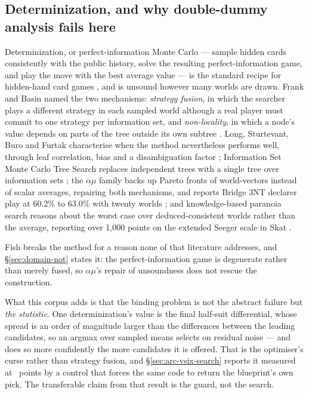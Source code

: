 \subsection{Determinization, and why double-dummy analysis fails here}
\label{sec:related-determinization}

Determinization, or perfect-information Monte Carlo --- sample hidden cards consistently with the
public history, solve the resulting perfect-information game, and play the move with the best
average value --- is the standard recipe for hidden-hand card games \cite{levy,ginsberg-gib}, and is
unsound however many worlds are drawn. Frank and Basin named the two mechanisms: \emph{strategy
fusion}, in which the searcher plays a different strategy in each sampled world although a real
player must commit to one strategy per information set, and \emph{non-locality}, in which a node's
value depends on parts of the tree outside its own subtree
\cite{frank-basin-ai,frank-basin-aaai}. Long, Sturtevant, Buro and Furtak characterise when the
method nevertheless performs well, through leaf correlation, bias and a disambiguation factor
\cite{long-pimc}; Information Set Monte Carlo Tree Search replaces independent trees with a single
tree over information sets \cite{cowling-ismcts,goodman-ris}; the $\alpha\mu$ family backs up Pareto
fronts of world-vectors instead of scalar averages, repairing both mechanisms, and reports Bridge
3NT declarer play at 60.2\% to 63.0\% with twenty worlds \cite{cazenave2019alphamu}; and
knowledge-based paranoia search reasons about the worst case over deduced-consistent worlds rather
than the average, reporting over 1{,}000 points on the extended Seeger scale in Skat
\cite{edelkamp2021paranoia}.

Fish breaks the method for a reason none of that literature addresses, and
\S\ref{sec:domain-not} states it: the perfect-information game is degenerate rather than merely
fused, so $\alpha\mu$'s repair of unsoundness does not rescue the construction.

What this corpus adds is that the binding problem is not the abstract failure but \emph{the
statistic}. One determinization's value is the final half-suit differential, whose spread is an
order of magnitude larger than the differences between the leading candidates, so an argmax over
sampled means selects on residual noise --- and does so more confidently the more candidates it is
offered. That is the optimiser's curse rather than strategy fusion, and \S\ref{sec:arc-vsix-search}
reports it measured at \vsixCurseGap{}~points by a control that forces the same code to return the
blueprint's own pick. The transferable claim from that result is the guard, not the search.

